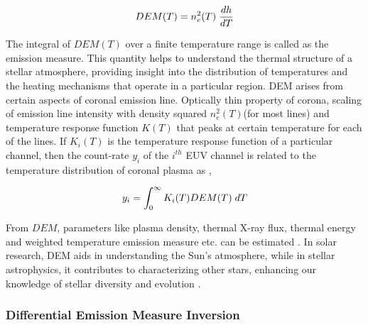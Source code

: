 \vspace{-.75cm}
\everymath{\displaystyle}
\begin{center}
    \begin{equation}
        DEM(T) = n_e^2(T) \hspace{0.1cm} \frac{dh}{dT}
    \end{equation}
\end{center}

The integral of $DEM(T)$ over a finite temperature range is called as the emission measure. This quantity helps to understand the thermal structure of a stellar atmosphere, providing insight into the distribution of temperatures and the heating mechanisms that operate in a particular region. DEM arises from certain aspects of coronal emission line. Optically thin property of corona, scaling of emission line intensity with density squared $n_e^2(T)$(for most lines) and temperature response function $K(T)$ that peaks at certain temperature for each of the lines. If $K_i(T)$ is the temperature response function of a particular channel, then the count-rate $y_i$ of the $i^{th}$ EUV channel is related to the temperature distribution of coronal plasma as \citep{Cheung2015},

\vspace{-.75cm}
\begin{center}
    \begin{equation}
        \label{eqn:count_rate_dem}
        y_i = \int_0^{\infty} K_i(T) DEM(T) \hspace{0.1cm} dT
    \end{equation}
\end{center}

From $DEM$, parameters like plasma density, thermal X-ray flux, thermal energy and weighted temperature emission measure etc. can be estimated \citep{Su2018-fq}. In solar research, DEM aids in understanding the Sun's atmosphere, while in stellar astrophysics, it contributes to characterizing other stars, enhancing our knowledge of stellar diversity and evolution \citep{Namekata2023-rq}.

\subsubsection{Differential Emission Measure Inversion}

